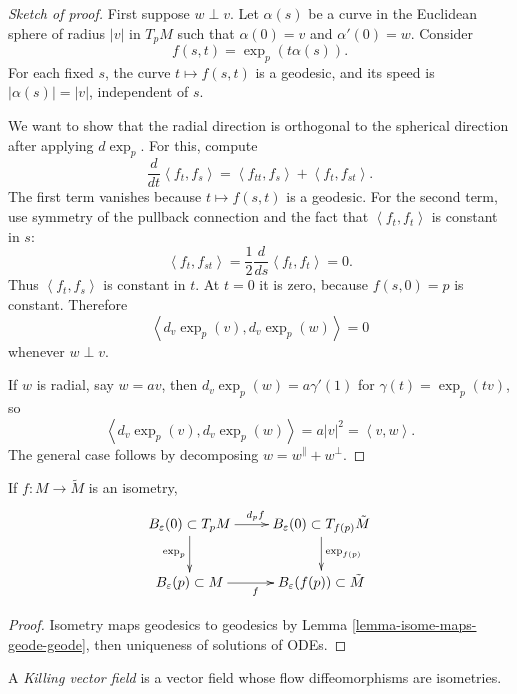 \begin{proof}[Sketch of proof]
First suppose $w\perp v$. Let
$\alpha(s)$ be a curve in the Euclidean
sphere of radius $|v|$ in $T_pM$ such that
$\alpha(0)=v$ and $\alpha'(0)=w$. Consider
$$
f(s,t)=\exp_p(t\alpha(s)).
$$
For each fixed $s$, the curve
$t\mapsto f(s,t)$ is a geodesic, and its
speed is $|\alpha(s)|=|v|$, independent of
$s$.

We want to show that the radial direction is
orthogonal to the spherical direction after
applying $d\exp_p$. For this, compute
$$
\frac{d}{dt}\left\langle{}f_t,f_s
\right\rangle{}
=
\left\langle{}f_{tt},f_s\right\rangle{}
+\left\langle{}f_t,f_{st}\right\rangle{}.
$$
The first term vanishes because
$t\mapsto f(s,t)$ is a geodesic. For the
second term, use symmetry of the pullback
connection and the fact that
$
\left\langle{}f_t,f_t\right\rangle{}
$
is
constant in $s$:
$$
\left\langle{}f_t,f_{st}\right\rangle{}
=
\frac{1}{2}\frac{d}{ds}
\left\langle{}f_t,f_t\right\rangle{}
=0.
$$
Thus $\left\langle{}f_t,f_s\right\rangle{}$
is constant in $t$. At $t=0$ it is zero,
because $f(s,0)=p$ is constant. Therefore
$$
\left\langle{}d_v\exp_p(v),d_v\exp_p(w)
\right\rangle{}
=0
$$
whenever $w\perp v$.

If $w$ is radial, say $w=av$, then
$d_v\exp_p(w)=a\gamma'(1)$ for
$\gamma(t)=\exp_p(tv)$, so
$$
\left\langle{}d_v\exp_p(v),d_v\exp_p(w)
\right\rangle{}
=
a|v|^2
=
\left\langle{}v,w\right\rangle{}.
$$
The general case follows by decomposing
$w=w^\parallel+w^\perp$.
\end{proof}

\begin{proposition}
\label{proposition-naturality-of-exponential}
If $f:M\to \tilde{M}$ is an isometry,
$$
\xymatrix{
B_\varepsilon(0)\subset T_pM \ar[r]^{d_p f}
\ar[d]_{\text{exp}_p} &
B_\varepsilon(0)\subset T_{f(p)}\tilde{M}
\ar[d]^{\text{exp}_{f(p)}} \\
B_\varepsilon(p)\subset M \ar[r]_{f} &
B_\varepsilon(f(p))\subset \tilde{M}
}
$$
\end{proposition}

\begin{proof}
Isometry maps geodesics to geodesics by Lemma
\ref{lemma-isome-maps-geode-geode},
then uniqueness of solutions
of ODEs.
\end{proof}

\begin{definition}
\label{definition-killing}
A {\it Killing vector field} is a vector
field
whose flow diffeomorphisms are isometries.
\end{definition}

